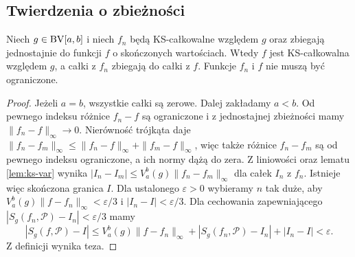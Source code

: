 \subsection*{Twierdzenia o zbieżności}
\begin{twierdzenie}\label{it:thm:ks-uniform}
Niech $g\in\mathrm{BV}[a,b]$ i niech $f_n$ będą KS-całkowalne
względem $g$ oraz zbiegają jednostajnie do funkcji $f$ o
skończonych wartościach. Wtedy $f$ jest KS-całkowalna
względem $g$, a całki z $f_n$ zbiegają do całki z $f$.
Funkcje $f_n$ i $f$ nie muszą być ograniczone.
\end{twierdzenie}
\begin{proof}
Jeżeli $a=b$, wszystkie całki są zerowe.
Dalej zakładamy $a<b$. Od pewnego indeksu różnice
$f_n-f$ są ograniczone i z jednostajnej zbieżności mamy
$\|f_n-f\|_\infty\to0$. Nierówność trójkąta daje
$\|f_n-f_m\|_\infty\le\|f_n-f\|_\infty+\|f_m-f\|_\infty$,
więc także różnice $f_n-f_m$ są od pewnego indeksu
ograniczone, a ich normy dążą do zera.
Z liniowości oraz lematu \ref{lem:ks-var} wynika
$|I_n-I_m|\le V_a^b(g)\|f_n-f_m\|_\infty$ dla całek
$I_n$ z $f_n$. Istnieje więc skończona granica $I$.
Dla ustalonego $\varepsilon>0$ wybieramy $n$ tak duże,
aby $V_a^b(g)\|f-f_n\|_\infty<\varepsilon/3$ i
$|I_n-I|<\varepsilon/3$. Dla cechowania zapewniającego
$|S_g(f_n,\mathcal P)-I_n|<\varepsilon/3$ mamy
\[
 |S_g(f,\mathcal P)-I|
 \le V_a^b(g)\|f-f_n\|_\infty+
       |S_g(f_n,\mathcal P)-I_n|+|I_n-I|<\varepsilon.
\]
Z definicji wynika teza.
\end{proof}

